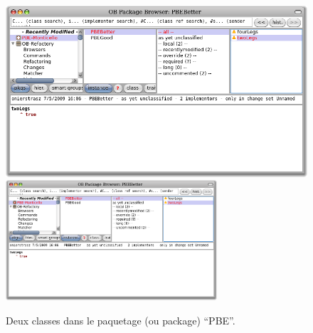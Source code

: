 \documentclass[a4paper,10pt,twoside]{book}
\begin{document}
\begin{figure}[btp]
	\begin{center}
	\ifluluelse
		{\includegraphics[width=\textwidth]{MCnewcategory}}
		{\includegraphics[width=0.7\textwidth]{MCnewcategory}}
	\end{center}
	\caption{Deux classes dans le paquetage (ou package) ``PBE''.}
\end{figure}
\end{document}
